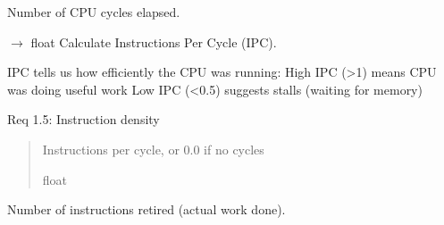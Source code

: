 \documentclass[letterpaper,10pt,english]{sphinxmanual}
\begin{document}
\begin{fulllineitems}
\begin{fulllineitems}
\label{\detokenize{core.models.energy_measurement:core.models.energy_measurement.PerformanceCounters.cpu_cycles}}
\pysigstartsignatures
\pysigline
{}
\pysigstopsignatures
\sphinxAtStartPar
Number of CPU cycles elapsed.

\end{fulllineitems}


\begin{fulllineitems}
\label{\detokenize{core.models.energy_measurement:core.models.energy_measurement.PerformanceCounters.instructions_per_cycle}}
\pysigstartsignatures
\pysiglinewithargsret
{}
{}
{{ $\rightarrow$ float}}
\pysigstopsignatures
\sphinxAtStartPar
Calculate Instructions Per Cycle (IPC).

\sphinxAtStartPar
IPC tells us how efficiently the CPU was running:
\sphinxhyphen{} High IPC (\textgreater{}1) means CPU was doing useful work
\sphinxhyphen{} Low IPC (\textless{}0.5) suggests stalls (waiting for memory)

\sphinxAtStartPar
Req 1.5: Instruction density
\begin{quote}\begin{description}
\sphinxAtStartPar
Instructions per cycle, or 0.0 if no cycles

\sphinxAtStartPar
float

\end{description}\end{quote}

\end{fulllineitems}


\begin{fulllineitems}
\label{\detokenize{core.models.energy_measurement:core.models.energy_measurement.PerformanceCounters.instructions_retired}}
\pysigstartsignatures
\pysigline
{}
\pysigstopsignatures
\sphinxAtStartPar
Number of instructions retired (actual work done).


\end{fulllineitems}
\end{fulllineitems}
\end{document}
